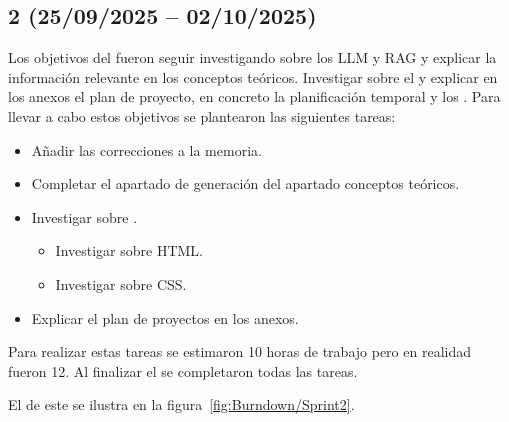 \subsection{ 2 (25/09/2025 -- 02/10/2025)}
Los objetivos del  fueron seguir investigando sobre los LLM y RAG y explicar la información relevante en los conceptos teóricos. Investigar sobre el  y explicar en los anexos el plan de proyecto, en concreto la planificación temporal y los .
Para llevar a cabo estos objetivos se plantearon las siguientes tareas:
\begin{itemize}
\tightlist
	\item Añadir las correcciones a la memoria.
	\item Completar el apartado  de generación del apartado conceptos teóricos.
	\item Investigar sobre .
	\begin{itemize}
	\tightlist
		\item Investigar sobre HTML.
		\item Investigar sobre CSS.
	\end{itemize}
	\item Explicar el plan de proyectos en los anexos.
\end{itemize}

Para realizar estas tareas se estimaron 10 horas de trabajo pero en realidad fueron 12. Al finalizar el  se completaron todas las tareas.

El  de este  se ilustra en la figura~\ref{fig:Burndown/Sprint2}.

